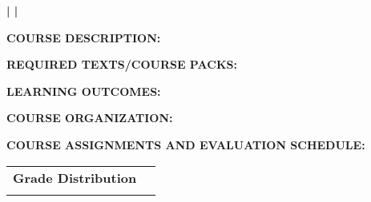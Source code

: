 
\usepackage{hyperref}


\begin{flushleft}
\textbf{\large \CourseCode | \CourseName | \Semester}
\end{flushleft}


\textbf{COURSE DESCRIPTION:}\\
\CourseDesc

\textbf{REQUIRED TEXTS/COURSE PACKS:}\\
\TextBook

\textbf{LEARNING OUTCOMES:}\\
\LearnOut

\textbf{COURSE ORGANIZATION:}\\
\CourseOrg

\textbf{COURSE ASSIGNMENTS AND EVALUATION SCHEDULE:}
\begin{flushleft}
	\begin{tabular}{c c}
		\textbf{Grade Distribution} \\
		\GradeDist
	\end{tabular}
\end{flushleft}
\CourseAss


